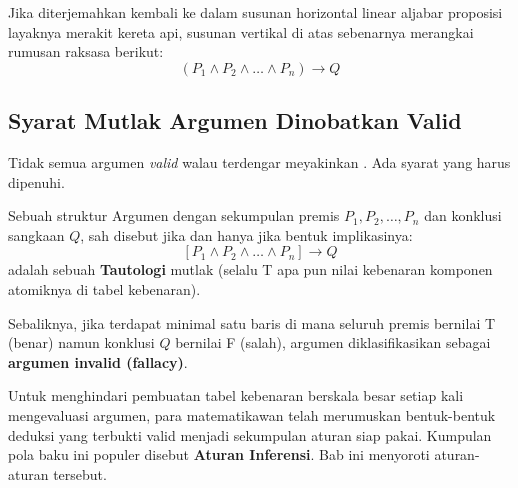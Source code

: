 Jika diterjemahkan kembali ke dalam susunan horizontal linear aljabar proposisi layaknya merakit kereta api, susunan vertikal di atas sebenarnya merangkai rumusan raksasa berikut:
\[ (P_1 \wedge P_2 \wedge \ldots \wedge P_n) \rightarrow Q \]

\subsection{Syarat Mutlak Argumen Dinobatkan Valid}

Tidak semua argumen \textit{valid} walau terdengar meyakinkan \cite{wiki_first_order_logic}. Ada syarat yang harus dipenuhi.

\begin{teorema}
Sebuah struktur Argumen dengan sekumpulan premis $P_1, P_2, \ldots, P_n$ dan konklusi sangkaan $Q$, sah disebut  jika dan hanya jika bentuk implikasinya:
\[ [P_1 \wedge P_2 \wedge \ldots \wedge P_n] \rightarrow Q \]
adalah sebuah \textbf{Tautologi} mutlak (selalu T apa pun nilai kebenaran komponen atomiknya di tabel kebenaran).
\end{teorema}

Sebaliknya, jika terdapat minimal satu baris di mana seluruh premis bernilai T (benar) namun konklusi $Q$ bernilai F (salah), argumen diklasifikasikan sebagai \textbf{argumen invalid (fallacy)}.

Untuk menghindari pembuatan tabel kebenaran berskala besar setiap kali mengevaluasi argumen, para matematikawan telah merumuskan bentuk-bentuk deduksi yang terbukti valid menjadi sekumpulan aturan siap pakai. Kumpulan pola baku ini populer disebut \textbf{Aturan Inferensi}. Bab ini menyoroti aturan-aturan tersebut.
